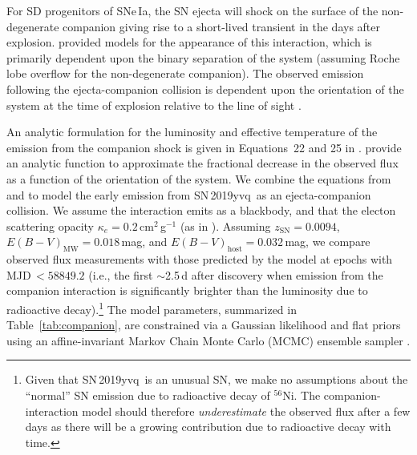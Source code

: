 \documentclass[twocolumn]{aastex63}
\newcommand{\radni}{$^{56}$Ni}
\newcommand{\sn}{SN\,2019yvq}
\begin{document}
For SD progenitors of SNe\,Ia, the SN ejecta will shock on the surface of the
non-degenerate companion giving rise to a short-lived transient in the days
after explosion. \citet{Kasen10a} provided models for the appearance of this
interaction, which is primarily dependent upon the binary separation of the
system (assuming Roche lobe overflow for the non-degenerate companion). The
observed emission following the ejecta-companion collision is dependent upon
the orientation of the system at the time of explosion relative to the line of
sight \citep{Kasen10a}.

An analytic formulation for the luminosity and effective temperature of the
emission from the companion shock is given in Equations~22 and 25 in
\citet{Kasen10a}. \citet{Brown12} provide an analytic function to approximate
the fractional decrease in the observed flux as a function of the orientation
of the system. We combine the equations from \citet{Kasen10a} and
\citet{Brown12} to model the early emission from \sn\ as an ejecta-companion
collision. We assume the interaction emits as a blackbody, and that the
electon scattering opacity $\kappa_e = 0.2$\,cm$^{2}$\,g$^{-1}$ (as in
\citealt{Kasen10a}). Assuming $z_\mathrm{SN} = 0.0094$, $E(B-V)_\mathrm{MW} =
0.018$\,mag, and $E(B-V)_\mathrm{host} = 0.032$\,mag, we compare observed flux
measurements with those predicted by the \citet{Kasen10a} model at epochs with
MJD$\,< 58849.2$ (i.e., the first $\sim$2.5\,d after discovery when emission
from the companion interaction is significantly brighter than the luminosity
due to radioactive decay).\footnote{Given that \sn\ is an unusual SN, we make
no assumptions about the ``normal'' SN emission due to radioactive decay of
\radni. The companion-interaction model should therefore
\textit{underestimate} the observed flux after a few days as there will be a
growing contribution due to radioactive decay with time.} The model
parameters, summarized in Table~\ref{tab:companion}, are constrained via a
Gaussian likelihood and flat priors using an affine-invariant
\citep{Goodman10} Markov Chain Monte Carlo (MCMC) ensemble sampler
\citep{Foreman-Mackey13}.


\end{document}
